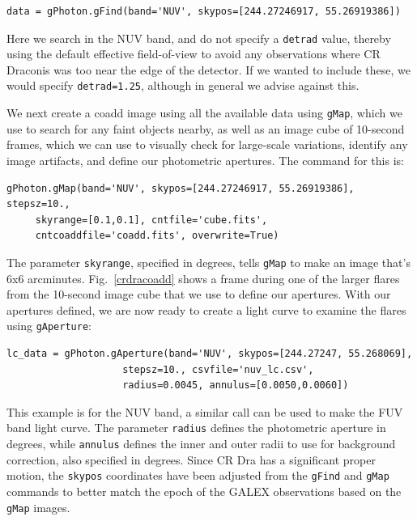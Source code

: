 \documentclass[preprint]{aastex}
\begin{document}
\begin{verbatim}
data = gPhoton.gFind(band='NUV', skypos=[244.27246917, 55.26919386])
\end{verbatim}

Here we search in the NUV band, and do not specify a \texttt{detrad} value, thereby using the default effective field-of-view to avoid any observations where CR Draconis was too near the edge of the detector.  If we wanted to include these, we would specify \texttt{detrad=1.25}, although in general we advise against this.

We next create a coadd image using all the available data using \texttt{gMap}, which we use to search for any faint objects nearby, as well as an image cube of 10-second frames, which we can use to visually check for large-scale variations, identify any image artifacts, and define our photometric apertures.  The command for this is:

\begin{verbatim}
gPhoton.gMap(band='NUV', skypos=[244.27246917, 55.26919386], stepsz=10.,
     skyrange=[0.1,0.1], cntfile='cube.fits',
     cntcoaddfile='coadd.fits', overwrite=True)
\end{verbatim}

The parameter \texttt{skyrange}, specified in degrees, tells \texttt{gMap} to make an image that's 6x6 arcminutes.  Fig.\ \ref{crdracoadd} shows a frame during one of the larger flares from the 10-second image cube that we use to define our apertures.  With our apertures defined, we are now ready to create a light curve to examine the flares using \texttt{gAperture}:

\begin{verbatim}
lc_data = gPhoton.gAperture(band='NUV', skypos=[244.27247, 55.268069],
                    stepsz=10., csvfile='nuv_lc.csv',
                    radius=0.0045, annulus=[0.0050,0.0060])
\end{verbatim}

This example is for the NUV band, a similar call can be used to make the FUV band light curve.  The parameter \texttt{radius} defines the photometric aperture in degrees, while \texttt{annulus} defines the inner and outer radii to use for background correction, also specified in degrees.  Since CR Dra has a significant proper motion, the \texttt{skypos} coordinates have been adjusted from the \texttt{gFind} and \texttt{gMap} commands to better match the epoch of the GALEX observations based on the \texttt{gMap} images.
\end{document}
